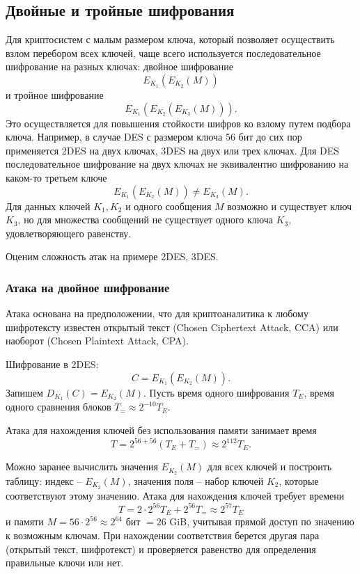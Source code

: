 \subsection{Двойные и тройные шифрования}

Для криптосистем с малым размером ключа, который позволяет осуществить взлом перебором всех ключей, чаще всего используется последовательное шифрование на разных ключах: двойное шифрование
    \[ E_{K_1}( E_{K_2}( M)) \]
и тройное шифрование
    \[ E_{K_1}( E_{K_2}( E_{K_3} (M))). \]
Это осуществляется для повышения стойкости шифров ко взлому путем подбора ключа.
Например, в случае DES с размером ключа 56 бит до сих пор применяется 2DES на двух ключах, 3DES на двух или трех ключах. Для DES последовательное шифрование на двух ключах не эквивалентно шифрованию на каком-то третьем ключе
    \[ E_{K_1}( E_{K_2} (M)) \neq E_{K_3}(M). \]
Для данных ключей $K_1, K_2$ и одного сообщения $M$ возможно и существует ключ $K_3$, но для множества сообщений не существует одного ключа $K_3$, удовлетворяющего равенству.

Оценим сложность атак на примере 2DES, 3DES.


\subsubsection{Атака на двойное шифрование}


Атака основана на предположении, что для криптоаналитика к любому шифротексту известен открытый текст (Chosen Ciphertext Attack, CCA) или наоборот (Chosen Plaintext Attack, CPA).

Шифрование в 2DES:
    \[ C = E_{K_1}( E_{K_2}(M)). \]
Запишем $D_{K_1}(C) = E_{K_2}(M)$. Пусть время одного шифрования $T_E$, время одного сравнения блоков $T_{=} \approx 2^{-10} T_E$.

Атака для нахождения ключей без использования памяти занимает время
    \[ T = 2^{56 + 56} (T_E + T_{=}) \approx 2^{112} T_E. \]

Можно заранее вычислить значения $E_{K_2}(M)$ для всех ключей и построить таблицу: индекс -- $E_{K_2}(M)$, значения поля -- набор ключей $K_2$, которые соответствуют этому значению. Атака для нахождения ключей требует времени
    \[ T = 2 \cdot 2^{56} T_E + 2^{56} T_{=} \approx 2^{57} T_E \]
и памяти $M = 56 \cdot 2^{56} \approx 2^{64}$ бит $= 26$ GiB, учитывая прямой доступ по значению к возможным ключам. При нахождении соответствия берется другая пара (открытый текст, шифротекст) и проверяется равенство для определения правильные ключи или нет.

